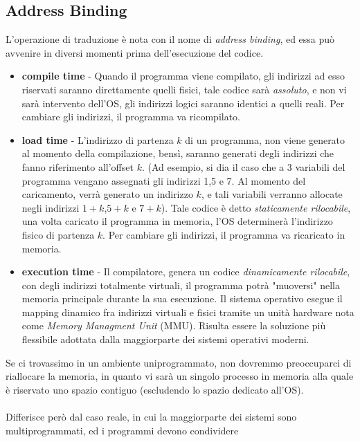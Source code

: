 \documentclass[12pt, letterpaper]{article}
\newcommand{\acc}{\\\hphantom{}\\}
\begin{document}
\subsection{Address Binding}
L'operazione di traduzione è nota con il nome di \textit{address binding}, ed essa può avvenire in diversi momenti
prima dell'esecuzione del codice.\begin{itemize}
    \item \textbf{compile time} - Quando il programma viene compilato, gli indirizzi ad esso riservati saranno direttamente 
    quelli fisici, tale codice sarà \textit{assoluto}, e non vi sarà intervento dell'OS, gli indirizzi logici saranno 
    identici a quelli reali. Per cambiare gli indirizzi, il programma va ricompilato.
    \item \textbf{load time} - L'indirizzo di partenza \(k\) di un programma, non viene generato al momento della compilazione, 
    bensì, saranno generati degli indirizzi che fanno riferimento all'offset \(k\). (Ad esempio, si dia il caso 
    che a 3 variabili del programma vengano assegnati gli indirizzi 1,5 e 7. Al momento del caricamento, 
    verrà generato un indirizzo \(k\), e tali variabili verranno allocate negli indirizzi \(1+k\),\(5+k\) e \(7+k\)).
     Tale codice è detto \textit{staticamente 
    rilocabile}, una volta caricato il programma in memoria, l'OS determinerà l'indirizzo fisico di partenza \(k\). 
    Per cambiare gli indirizzi, il programma va ricaricato in memoria.
    \item \textbf{execution time} - Il compilatore, genera un codice \textit{dinamicamente 
    rilocabile}, con degli indirizzi totalmente virtuali, il programma potrà "muoversi" nella memoria principale
    durante la sua esecuzione. Il sistema operativo esegue il mapping dinamico fra indirizzi virtuali e fisici 
    tramite un unità hardware nota come  \textit{Memory Managment Unit} (MMU). Risulta essere la soluzione più 
    flessibile adottata dalla maggiorparte dei sistemi operativi moderni.
\end{itemize}
Se ci trovassimo in un ambiente uniprogrammato, non dovremmo preoccuparci di riallocare la memoria, in quanto vi sarà 
un singolo processo in memoria alla quale è riservato uno spazio contiguo (escludendo lo spazio dedicato all'OS).\acc 
Differisce però dal caso reale, in cui la maggiorparte dei sistemi sono multiprogrammati, ed i programmi devono condividere 
\end{document}
